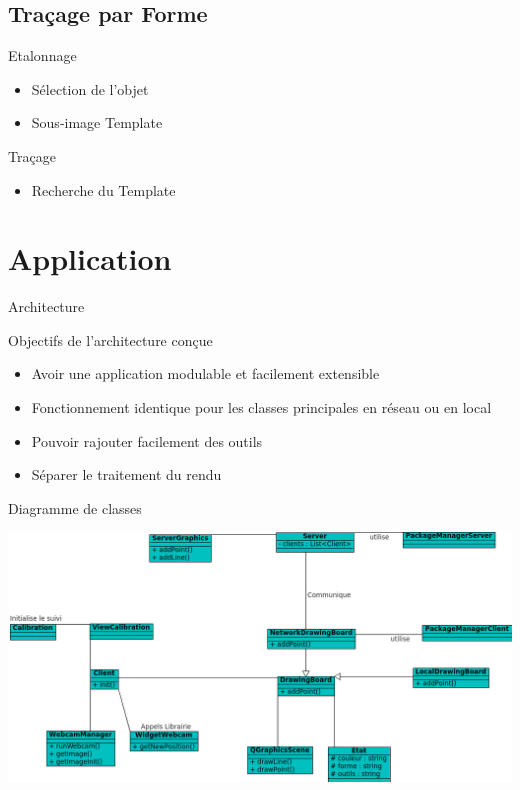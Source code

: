 \documentclass{beamer}
\begin{document}
		\subsection{Traçage par Forme}
		\begin{frame}{Etalonnage}
				\begin{itemize}
					\item{Sélection de l'objet}
					\item{Sous-image Template}
				\end{itemize}
		\end{frame}

		\begin{frame}{Traçage}
				\begin{itemize}
					\item{Recherche du Template}
				\end{itemize}
		\end{frame}
	
	
	\section{Application}
		\begin{frame}{Architecture}
			\begin{block}{Objectifs de l'architecture conçue}
				\begin{itemize}
				\item{Avoir une application modulable et facilement extensible}
				\item{Fonctionnement identique pour les classes principales en réseau ou en local}
				\item{Pouvoir rajouter facilement des outils}
				\item{Séparer le traitement du rendu}
				\end{itemize}
			\end{block}
		\end{frame}
		
		\begin{frame}{Diagramme de classes}
			\begin{center}		
			\includegraphics[scale=0.45]{../uml/classes.png}
			\end{center}
		\end{frame}
		
\end{document}
